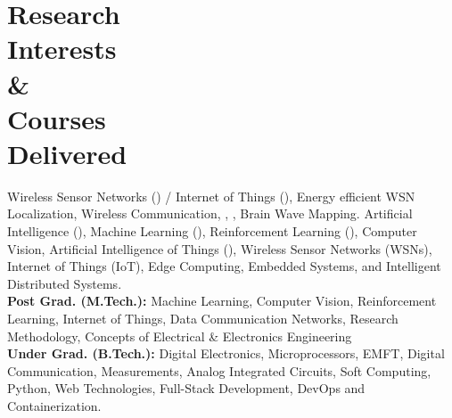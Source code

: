 \vspace{-2.5em}
{\section{Research\\Interests\\\&\\Courses\\Delivered}
Wireless Sensor Networks () / Internet of Things (), Energy efficient WSN Localization, Wireless Communication, , , Brain Wave Mapping. Artificial Intelligence (), Machine Learning (), Reinforcement Learning (), Computer Vision, Artificial Intelligence of Things (), Wireless Sensor Networks (WSNs), Internet of Things (IoT), Edge Computing, Embedded Systems, and Intelligent Distributed Systems.\\ 
\textbf{Post Grad. (M.Tech.):} Machine Learning, Computer Vision, Reinforcement Learning, Internet of Things, Data Communication Networks, Research Methodology, Concepts of Electrical \& Electronics Engineering\\
\textbf{Under Grad. (B.Tech.):} Digital Electronics, Microprocessors, EMFT, Digital Communication, Measurements, Analog Integrated Circuits, Soft Computing, Python, Web Technologies, Full-Stack Development, DevOps and Containerization. 
\sectionline
}

